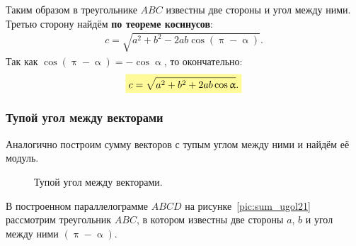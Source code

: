 Таким образом в треугольнике $ABC$ известны две стороны и угол между ними.
Третью сторону найдём \textbf{по теореме косинусов}:
\begin{align}
  c = \sqrt{a^2 + b^2 - 2 a b\cos(\uppi-\upalpha)}.
\end{align}
Так как $\cos(\uppi-\upalpha) = -\cos\upalpha$, то окончательно:
{\large
  \begin{align}
    \hly{c = \sqrt{a^2 + b^2 + 2 a b\cos\upalpha}.}
  \end{align}
}

\clearpage

\subsubsection{Тупой угол между векторами}
Аналогично построим сумму векторов с тупым углом между ними и найдём
её модуль.
\begin{figure}[h]
  \centering
  \caption{\small Тупой угол между векторами.}\label{pic:sum_ugol2}
\end{figure}

В построенном параллелограмме $ABCD$ на рисунке~\ref{pic:sum_ugol21}
рассмотрим треугольник $ABC$,
в котором известны две стороны $a$, $b$ и угол между ними $(\uppi-\upalpha)$.

